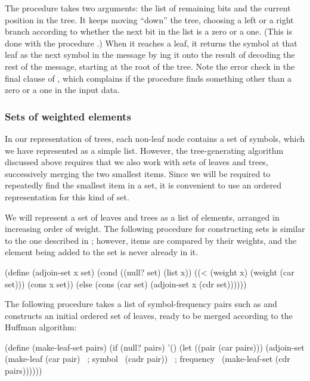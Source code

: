 \noindent
The procedure  takes two arguments: the list of remaining bits
and the current position in the tree.  It keeps moving ``down'' the tree,
choosing a left or a right branch according to whether the next bit in the list
is a zero or a one.  (This is done with the procedure .)
When it reaches a leaf, it returns the symbol at that leaf as the next symbol
in the message by ing it onto the result of decoding the rest of the
message, starting at the root of the tree.  Note the error check in the final
clause of , which complains if the procedure finds
something other than a zero or a one in the input data.

\subsubsection*{Sets of weighted elements}

In our representation of trees, each non-leaf node contains a set of symbols,
which we have represented as a simple list.  However, the tree-generating
algorithm discussed above requires that we also work with sets of leaves and
trees, successively merging the two smallest items.  Since we will be required
to repeatedly find the smallest item in a set, it is convenient to use an
ordered representation for this kind of set.

We will represent a set of leaves and trees as a list of elements, arranged in
increasing order of weight.  The following  procedure for
constructing sets is similar to the one described in ;
however, items are compared by their weights, and the element being added to
the set is never already in it.

\begin{codeBlock}
(define (adjoin-set x set)
  (cond ((null? set) (list x))
        ((< (weight x) (weight (car set)))
          (cons x set))
        (else (cons (car set)
                    (adjoin-set x (cdr set))))))
\end{codeBlock}

\noindent
The following procedure takes a list of symbol-frequency pairs such as
 and constructs an initial ordered set of
leaves, ready to be merged according to the Huffman algorithm:

\begin{codeBlock}
(define (make-leaf-set pairs)
  (if (null? pairs)
      '()
      (let ((pair (car pairs)))
        (adjoin-set (make-leaf (car pair)    ~\textrm{; symbol}~
                               (cadr pair))  ~\textrm{; frequency}~
                    (make-leaf-set (cdr pairs))))))
\end{codeBlock}

